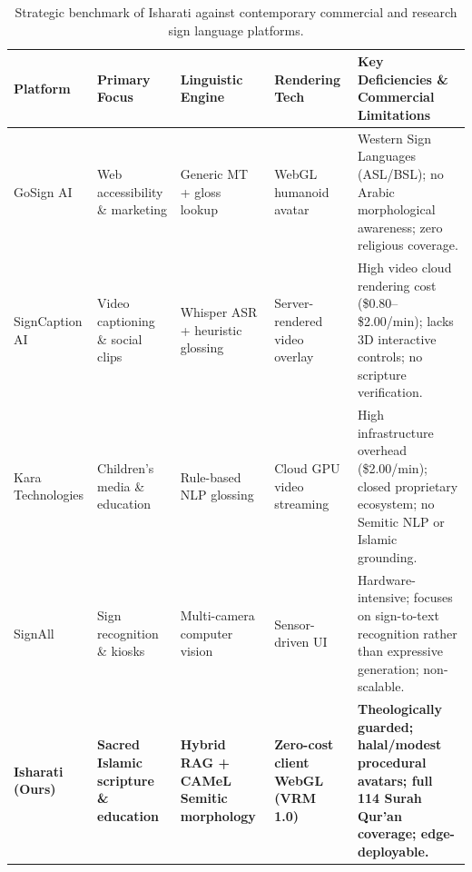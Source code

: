 \begin{table}[ht]
\centering\small
\caption{Strategic benchmark of Isharati against contemporary commercial and research sign language platforms.}
\label{tab:competitor_matrix}
\begin{tabularx}{\textwidth}{L{2.6cm} L{2.2cm} L{2.6cm} L{2.2cm} Y}
\toprule
Platform & Primary Focus & Linguistic Engine & Rendering Tech & Key Deficiencies \& Commercial Limitations \\
\midrule
GoSign AI & Web accessibility \& marketing & Generic MT + gloss lookup & WebGL humanoid avatar & Western Sign Languages (ASL/BSL); no Arabic morphological awareness; zero religious coverage. \\
SignCaption AI & Video captioning \& social clips & Whisper ASR + heuristic glossing & Server-rendered video overlay & High video cloud rendering cost (\$0.80--\$2.00/min); lacks 3D interactive controls; no scripture verification. \\
Kara Technologies & Children's media \& education & Rule-based NLP glossing & Cloud GPU video streaming & High infrastructure overhead (\$2.00/min); closed proprietary ecosystem; no Semitic NLP or Islamic grounding. \\
SignAll & Sign recognition \& kiosks & Multi-camera computer vision & Sensor-driven UI & Hardware-intensive; focuses on sign-to-text recognition rather than expressive generation; non-scalable. \\
\midrule
\textbf{Isharati (Ours)} & \textbf{Sacred Islamic scripture \& education} & \textbf{Hybrid RAG + CAMeL Semitic morphology} & \textbf{Zero-cost client WebGL (VRM 1.0)} & \textbf{Theologically guarded; halal/modest procedural avatars; full 114 Surah Qur'an coverage; edge-deployable.} \\
\bottomrule
\end{tabularx}
\end{table}

